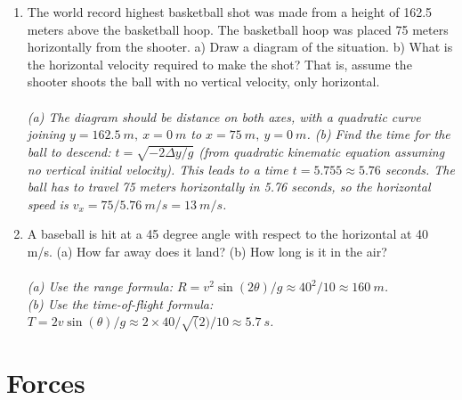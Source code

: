 \documentclass[10pt]{article}
\begin{document}
\begin{enumerate}
\item The world record highest basketball shot was made from a height of 162.5 meters above the basketball hoop.  The basketball hoop was placed 75 meters horizontally from the shooter.  a) Draw a diagram of the situation.  b) What is the horizontal velocity required to make the shot?  That is, assume the shooter shoots the ball with no vertical velocity, only horizontal. \\ \\
\textit{(a) The diagram should be distance on both axes, with a quadratic curve joining $y = 162.5~m, ~x=0~m$ to $x = 75~m, ~y=0~m$. (b) Find the time for the ball to descend: $t = \sqrt{-2\Delta y/g}$ (from quadratic kinematic equation assuming no vertical initial velocity).  This leads to a time $t = 5.755\approx 5.76$ seconds. The ball has to travel 75 meters horizontally in 5.76 seconds, so the horizontal speed is $v_x = 75/5.76~m/s = 13~m/s$.}
\item A baseball is hit at a 45 degree angle with respect to the horizontal at 40 m/s.  (a) How far away does it land? (b) How long is it in the air? \\ \\
\textit{(a) Use the range formula: $R = v^2\sin(2\theta)/g \approx 40^2/10 \approx 160~m$.} \\
\textit{(b) Use the time-of-flight formula: $T = 2v\sin(\theta)/g \approx 2\times 40/\sqrt(2)/10 \approx 5.7~s$.}
\end{enumerate}

\section{Forces}
\end{document}
